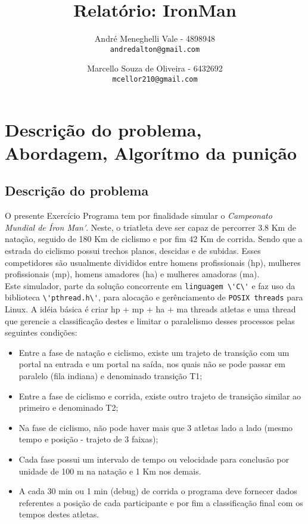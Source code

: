\documentclass[12pt,a4paper]{article}
\author{
    André Meneghelli Vale - 4898948\\
    \texttt{andredalton@gmail.com}
    \and
    Marcello Souza de Oliveira - 6432692\\
    \texttt{mcellor210@gmail.com}
}
\title{Relatório: IronMan}
\begin{document}
\maketitle

\section{Descrição do problema, Abordagem, Algorítmo da punição}

\subsection{Descrição do problema}

   O presente Exercício Programa tem por finalidade simular o \emph{Campeonato Mundial 
de \'Iron Man\'}. Neste, o triatleta deve ser capaz de percorrer 3.8 Km de natação,
seguido de 180 Km de ciclismo e por fim 42 Km de corrida. Sendo que a estrada do ciclismo possui
trechos planos, descidas e de subidas. Esses competidores são usualmente
divididos entre homens profissionais (hp), mulheres profissionais (mp), homens
amadores (ha) e mulheres amadoras (ma). \\
Este simulador, parte da solução concorrente em \verb+linguagem \'C\'+ e faz uso da
biblioteca \verb+\'pthread.h\'+, para alocação e gerênciamento de \verb+POSIX threads+ para
Linux. A idéia básica é criar hp + mp + ha + ma threads atletas e uma thread que
gerencie a classificação destes e limitar o paralelismo desses processos
pelas seguintes condições:

\begin{itemize}
\item Entre a fase de natação e ciclismo, existe um trajeto de transição com um
portal na entrada e um portal na saída, nos quais não se pode passar em paralelo
(fila indiana) e denominado transição T1;
\item Entre a fase de ciclismo e corrida, existe outro trajeto de transição
similar ao primeiro e denominado T2;
\item Na fase de ciclismo, não pode haver mais que 3 atletas lado a lado (mesmo
tempo e posição - trajeto de 3 faixas);
\item Cada fase possui um intervalo de tempo ou velocidade para conclusão por
unidade de 100 m na natação e 1 Km nos demais.
\item A cada 30 min ou 1 min (debug) de corrida o programa deve fornecer
dados referentes a posição de cada participante e por fim a classificação
final com os tempos destes atletas.
\end{itemize}
\end{document}
